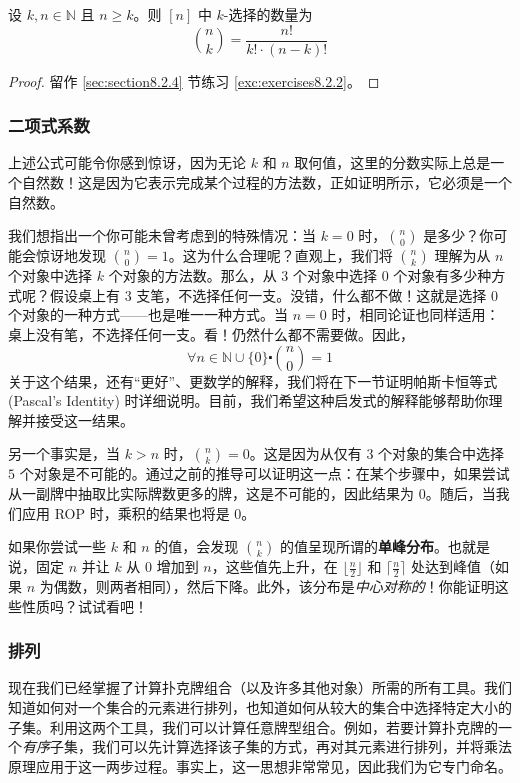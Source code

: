 \begin{proposition}\label{prop:proposition8.2.16}
    设 $k, n \in \mathbb{N}$ 且 $n \ge k$。则 $[n]$ 中 $k$-选择的数量为
    \[{n \choose k} = \frac{n!}{k! \cdot (n-k)!}\]
\end{proposition}

\begin{proof}
    留作 \ref{sec:section8.2.4} 节练习 \ref{exc:exercises8.2.2}。
\end{proof}

\subsubsection*{二项式系数}

上述公式可能令你感到惊讶，因为无论 $k$ 和 $n$ 取何值，这里的分数实际上总是一个自然数！这是因为它表示完成某个过程的方法数，正如证明所示，它必须是一个自然数。

我们想指出一个你可能未曾考虑到的特殊情况：当 $k = 0$ 时，${n \choose 0}$ 是多少？你可能会惊讶地发现 ${n \choose 0} = 1$。这为什么合理呢？直观上，我们将 ${n \choose k}$ 理解为从 $n$ 个对象中选择 $k$ 个对象的方法数。那么，从 $3$ 个对象中选择 $0$ 个对象有多少种方式呢？假设桌上有 $3$ 支笔，不选择任何一支。没错，什么都不做！这就是选择 $0$ 个对象的一种方式——也是唯一一种方式。当 $n = 0$ 时，相同论证也同样适用：桌上没有笔，不选择任何一支。看！仍然什么都不需要做。因此，
\[\forall n \in \mathbb{N} \cup \{0\} \centerdot {n \choose 0}=1\]
关于这个结果，还有``更好''、更数学的解释，我们将在下一节证明帕斯卡恒等式 (Pascal's Identity) 时详细说明。目前，我们希望这种启发式的解释能够帮助你理解并接受这一结果。

另一个事实是，当 $k > n$ 时，${n \choose k} = 0$。这是因为从仅有 $3$ 个对象的集合中选择 $5$ 个对象是不可能的。通过之前的推导可以证明这一点：在某个步骤中，如果尝试从一副牌中抽取比实际牌数更多的牌，这是不可能的，因此结果为 $0$。随后，当我们应用 ROP 时，乘积的结果也将是 $0$。

如果你尝试一些 $k$ 和 $n$ 的值，会发现 ${n \choose k}$ 的值呈现所谓的\textbf{单峰分布}。也就是说，固定 $n$ 并让 $k$ 从 $0$ 增加到 $n$，这些值先上升，在 $\lfloor\frac{n}{2}\rfloor$ 和 $\lceil\frac{n}{2}\rceil$ 处达到峰值（如果 $n$ 为偶数，则两者相同），然后下降。此外，该分布是\emph{中心对称的}！你能证明这些性质吗？试试看吧！

\subsubsection*{排列}

现在我们已经掌握了计算扑克牌组合（以及许多其他对象）所需的所有工具。我们知道如何对一个集合的元素进行排列，也知道如何从较大的集合中选择特定大小的子集。利用这两个工具，我们可以计算任意牌型组合。例如，若要计算扑克牌的一个\emph{有序}子集，我们可以先计算选择该子集的方式，再对其元素进行排列，并将乘法原理应用于这一两步过程。事实上，这一思想非常常见，因此我们为它专门命名。

